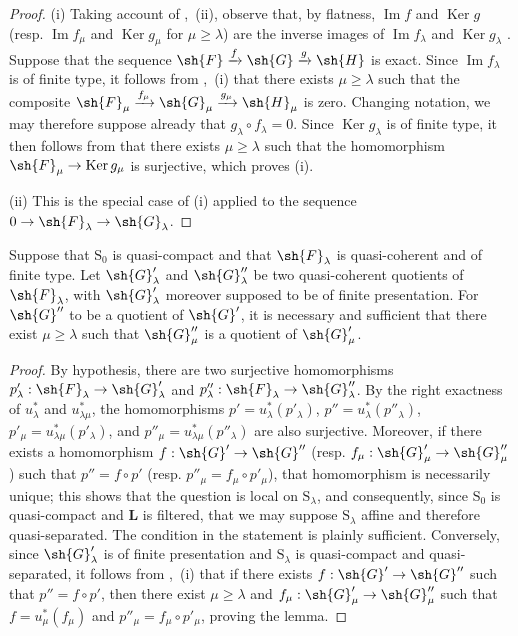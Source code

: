 \begin{proof}
(i) Taking account of ,~(ii), observe that, by flatness, $\operatorname{Im} f$ and $\operatorname{Ker} g$ (resp. $\operatorname{Im} f_\mu$ and $\operatorname{Ker} g_\mu$ for $\mu\geqslant\lambda$) are the inverse images of $\operatorname{Im} f_\lambda$ and $\operatorname{Ker} g_\lambda$ . Suppose that the sequence $\sh{F}\xrightarrow{f}\sh{G}\xrightarrow{g}\sh{H}$ is exact. Since $\operatorname{Im} f_\lambda$ is of finite type, it follows from ,~(i) that there exists $\mu\geqslant\lambda$ such that the composite $\sh{F}_\mu\xrightarrow{f_\mu}\sh{G}_\mu\xrightarrow{g_\mu}\sh{H}_\mu$ is zero. Changing notation, we may therefore suppose already that $g_\lambda\circ f_\lambda=0$. Since $\operatorname{Ker} g_\lambda$ is of finite type, it then follows from  that there exists $\mu\geqslant\lambda$ such that the homomorphism $\sh{F}_\mu\to\operatorname{Ker} g_\mu$ is surjective, which proves (i).

(ii) This is the special case of (i) applied to the sequence $0\to\sh{F}_\lambda\to\sh{G}_\lambda$.
\end{proof}

\begin{lemma}[8.5.9]
\label{IV.8.5.9}
Suppose that $\mathrm{S}_0$ is quasi-compact and that $\sh{F}_\lambda$ is quasi-coherent and of finite type. Let $\sh{G}'_\lambda$ and $\sh{G}''_\lambda$ be two quasi-coherent quotients of $\sh{F}_\lambda$, with $\sh{G}'_\lambda$ moreover supposed to be of finite presentation. For $\sh{G}''$ to be a quotient of $\sh{G}'$, it is necessary and sufficient that there exist $\mu\geqslant\lambda$ such that $\sh{G}''_\mu$ is a quotient of $\sh{G}'_\mu$.
\end{lemma}

\begin{proof}
By hypothesis, there are two surjective homomorphisms $p'_\lambda:\sh{F}_\lambda\to\sh{G}'_\lambda$ and $p''_\lambda:\sh{F}_\lambda\to\sh{G}''_\lambda$. By the right exactness of $u_\lambda^*$ and $u_{\lambda\mu}^*$, the homomorphisms $p'=u_\lambda^*(p'_\lambda)$, $p''=u_\lambda^*(p''_\lambda)$, $p'_\mu=u_{\lambda\mu}^*(p'_\lambda)$, and $p''_\mu=u_{\lambda\mu}^*(p''_\lambda)$ are also surjective. Moreover, if there exists a homomorphism $f:\sh{G}'\to\sh{G}''$ (resp. $f_\mu:\sh{G}'_\mu\to\sh{G}''_\mu$) such that $p''=f\circ p'$ (resp. $p''_\mu=f_\mu\circ p'_\mu$), that homomorphism is necessarily unique; this shows that the question is local on $\mathrm{S}_\lambda$, and consequently, since $\mathrm{S}_0$ is quasi-compact and $\mathbf{L}$ is filtered, that we may suppose $\mathrm{S}_\lambda$ affine and therefore quasi-separated. The condition in the statement is plainly sufficient. Conversely, since $\sh{G}'_\lambda$ is of finite presentation and $\mathrm{S}_\lambda$ is quasi-compact and quasi-separated, it follows from ,~(i) that if there exists $f:\sh{G}'\to\sh{G}''$ such that $p''=f\circ p'$, then there exist $\mu\geqslant\lambda$ and $f_\mu:\sh{G}'_\mu\to\sh{G}''_\mu$ such that $f=u_\mu^*(f_\mu)$ and $p''_\mu=f_\mu\circ p'_\mu$, proving the lemma.
\end{proof}

